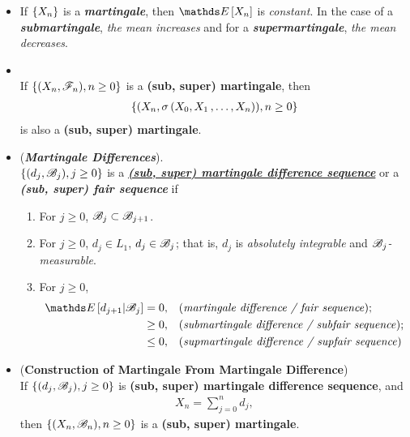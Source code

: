 \documentclass[11pt]{article}
\begin{document}
\begin{itemize}
\item \begin{remark}
If $\left\{X_n\right\}$ is a \emph{\textbf{martingale}}, then $\E{}{X_n}$ is \emph{constant}. In the case of a \emph{\textbf{submartingale}}, \emph{the mean increases} and for a \emph{\textbf{supermartingale}}, \emph{the mean decreases}.
\end{remark}

\item \begin{proposition} \citep{resnick2013probability}\\
If  $\left\{ (X_n, {\mathscr F}_n),  n \ge 0\right\}$ is a \textbf{(sub, super) martingale}, then 
\begin{align*}
\left\{ (X_n, \sigma\left(X_0, X_1 \,{,}\ldots{,}\, X_n\right)),  n \ge 0\right\}
\end{align*} is also a \textbf{(sub, super) martingale}.
\end{proposition}

\item \begin{definition} (\textbf{\emph{Martingale Differences}}).  \citep{resnick2013probability}\\
$\left\{(d_j, {\mathscr B}_j), j \ge 0\right\}$ is a \underline{\emph{\textbf{(sub, super) martingale difference sequence}}} or a \textit{\textbf{(sub, super) fair sequence}} if
\begin{enumerate}
\item For $j \ge 0$,  ${\mathscr B}_j \subset {\mathscr B}_{j+1}$.
\item For $j \ge 0$,  $d_j \in L_1$,  $d_j \in {\mathscr B}_j$; that is, $d_j$ is \emph{absolutely integrable} and \emph{${\mathscr B}_j$-measurable}.
\item For $j \ge 0$,
\begin{align*}
\E{}{d_{j+1} | \srB_j} &= 0, && \text{(\emph{martingale difference / fair sequence})};\\
& \ge 0, && \text{(\emph{submartingale difference / subfair sequence})};\\
& \le 0, && \text{(\emph{supmartingale difference / supfair sequence})}
\end{align*}
\end{enumerate}
\end{definition}

\item \begin{proposition} (\textbf{Construction of Martingale From Martingale Difference})\citep{resnick2013probability}\\
If $\left\{(d_j, {\mathscr B}_j), j \ge 0\right\}$ is \textbf{(sub, super) martingale difference sequence}, and
\begin{align*}
X_n = \sum_{j=0}^{n} d_j, 
\end{align*} then $\left\{(X_n, {\mathscr B}_n), n \ge 0\right\}$ is a \textbf{(sub, super) martingale}.
\end{proposition}


\end{itemize}
\end{document}
